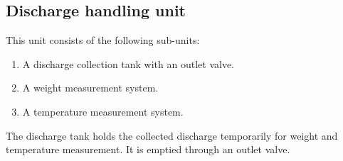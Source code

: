 \subsection{Discharge handling unit}

This unit consists of the following sub-units:
\begin{enumerate}
    \item  A discharge collection tank with an outlet valve.
    \item  A weight measurement system.
    \item A temperature measurement system.
\end{enumerate}

The discharge tank holds the collected discharge temporarily for weight and temperature measurement. It is emptied through an outlet valve.


